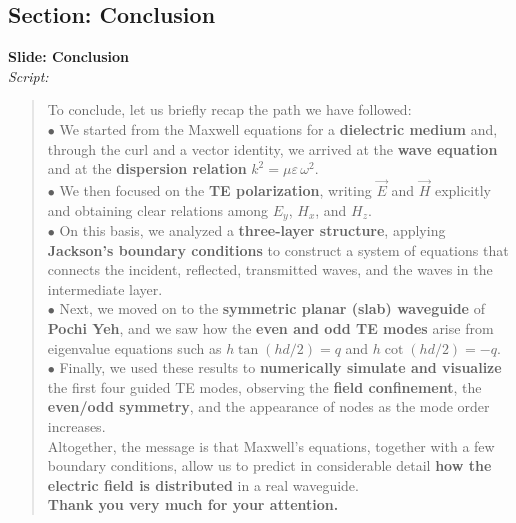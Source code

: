 \documentclass{article}
\begin{document}
\vspace{0.8cm}

\subsection*{Section: Conclusion}

\noindent
\textbf{Slide: Conclusion}\\[2mm]
\textit{Script:}\\[2mm]

\begin{quote}
To conclude, let us briefly recap the path we have followed:\\[2mm]
\(\bullet\) We started from the \textcolor{Apple Green}{Maxwell equations} for a 
\textbf{dielectric medium} and, through the curl and a vector identity, we arrived at the 
\textbf{wave equation} and at the \textbf{dispersion relation} 
\(k^2 = \mu\varepsilon\,\omega^2\).\\[2mm]
\(\bullet\) We then focused on the \textbf{TE polarization}, writing \(\vec{E}\) and \(\vec{H}\) 
explicitly and obtaining clear relations among \(E_y\), \(H_x\), and \(H_z\).\\[2mm]
\(\bullet\) On this basis, we analyzed a \textbf{three-layer structure}, applying 
\textbf{Jackson’s boundary conditions} to construct a system of equations that connects the 
incident, reflected, transmitted waves, and the waves in the intermediate layer.\\[2mm]
\(\bullet\) Next, we moved on to the \textbf{symmetric planar (slab) waveguide} of 
\textbf{Pochi Yeh}, and we saw how the \textbf{even and odd TE modes} arise from eigenvalue equations 
such as \(h\tan(hd/2) = q\) and \(h\cot(hd/2) = -q\).\\[2mm]
\(\bullet\) Finally, we used these results to \textbf{numerically simulate and visualize} the first 
four guided TE modes, observing the \textbf{field confinement}, the 
\textbf{even/odd symmetry}, and the appearance of nodes as the mode order increases.\\[3mm]
Altogether, the message is that Maxwell’s equations, together with a few boundary conditions, 
allow us to predict in considerable detail \textbf{how the electric field is distributed} in a 
real waveguide.\\[2mm]
\textbf{Thank you very much for your attention.}
\end{quote}
\end{document}
